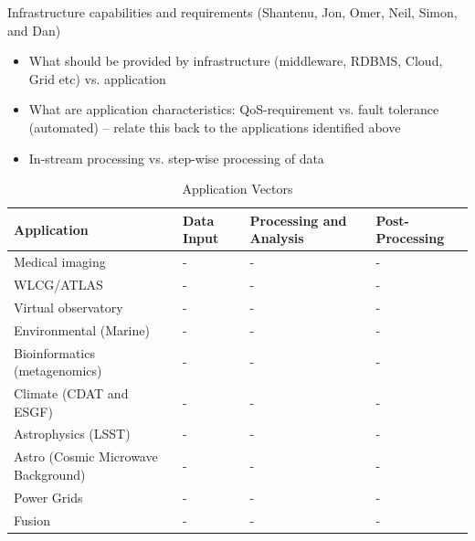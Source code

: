 \documentclass[preprint,12pt]{article}
\newcommand{\jhanote}[1]{  {\textcolor{blue}     { ***Shantenu: #1 }}}
\newcommand{\jhanote}[1]{}
\begin{document}
Infrastructure capabilities and requirements  (Shantenu, Jon, Omer, Neil, Simon, and Dan)
\begin{itemize}
\item What should be provided by infrastructure (middleware, RDBMS, Cloud, Grid etc) vs. application
\item What are application characteristics: QoS-requirement vs. fault tolerance (automated) -- relate this back to the applications identified above
\item In-stream processing vs. step-wise processing of data
\end{itemize}


\begin{table}
\begin{footnotesize}
\begin{center}
\begin{tabular}{|l|l|l|l|}
  \hline Application  & Data Input & Processing and Analysis & Post-Processing  \\
  \hline
  \hline Medical imaging & - &  - &  - \\
  \hline WLCG/ATLAS & - &  - &  - \\
  \hline Virtual observatory & - &  - &  - \\
  \hline Environmental (Marine) & - &  - &  - \\
  \hline Bioinformatics (metagenomics) & - &  - &  - \\
  \hline Climate (CDAT and ESGF) & - &  - &  - \\
  \hline Astrophysics (LSST) & - &  - &  - \\
  \hline Astro (Cosmic Microwave Background) & - &  - &  - \\
  \hline Power Grids & - &  - &  - \\
  \hline Fusion & - &  - &  - \\
  \hline
\end{tabular}
\caption{Application Vectors\label{table:vectors}}
\end{center}
\end{footnotesize}
\end{table}
\end{document}
